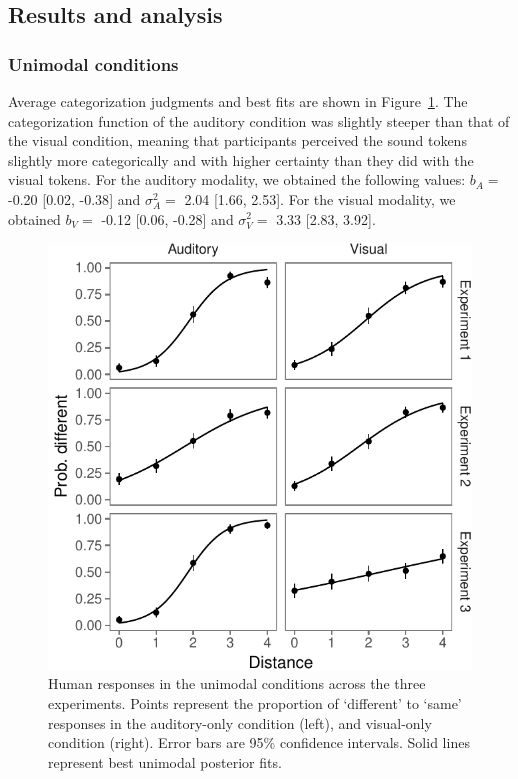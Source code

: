 \documentclass[english,floatsintext,man]{apa6}
\theoremstyle{definition}
\theoremstyle{definition}
\theoremstyle{definition}
\theoremstyle{remark}
\begin{document}
\subsection{Results and analysis}\label{results-and-analysis}

\subsubsection{Unimodal conditions}\label{unimodal-conditions-1}

Average categorization judgments and best fits are shown in
Figure~\ref{fig:unimodal}. The categorization function of the auditory
condition was slightly steeper than that of the visual condition,
meaning that participants perceived the sound tokens slightly more
categorically and with higher certainty than they did with the visual
tokens. For the auditory modality, we obtained the following values:
\(b_A=\) -0.20 {[}0.02, -0.38{]} and \(\sigma^2_A=\) 2.04 {[}1.66,
2.53{]}. For the visual modality, we obtained \(b_V=\) -0.12 {[}0.06,
-0.28{]} and \(\sigma^2_V=\) 3.33 {[}2.83, 3.92{]}.

\begin{figure}[!h]
\includegraphics[width=\textwidth]{ms_files/figure-latex/unimodal-1} \caption{Human responses in the unimodal conditions across the three experiments. Points represent the proportion of `different' to `same' responses in the auditory-only condition (left), and visual-only condition (right). Error bars are 95\% confidence intervals. Solid lines represent best unimodal posterior fits.}\label{fig:unimodal}
\end{figure}
\end{document}
